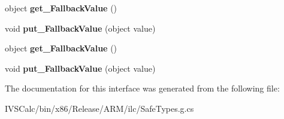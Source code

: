 \begin{DoxyCompactItemize}
\item 
\mbox{\label{interface_windows_1_1_u_i_1_1_xaml_1_1_data_1_1_i_binding2_a737ad88f941b133d93f199ad69775013}} 
object {\bfseries get\+\_\+\+Fallback\+Value} ()
\item 
\mbox{\label{interface_windows_1_1_u_i_1_1_xaml_1_1_data_1_1_i_binding2_ac552a7f9e03997146250b19bd1f8dbfc}} 
void {\bfseries put\+\_\+\+Fallback\+Value} (object value)
\item 
\mbox{\label{interface_windows_1_1_u_i_1_1_xaml_1_1_data_1_1_i_binding2_a737ad88f941b133d93f199ad69775013}} 
object {\bfseries get\+\_\+\+Fallback\+Value} ()
\item 
\mbox{\label{interface_windows_1_1_u_i_1_1_xaml_1_1_data_1_1_i_binding2_ac552a7f9e03997146250b19bd1f8dbfc}} 
void {\bfseries put\+\_\+\+Fallback\+Value} (object value)
\end{DoxyCompactItemize}


The documentation for this interface was generated from the following file\+:\begin{DoxyCompactItemize}
\item 
I\+V\+S\+Calc/bin/x86/\+Release/\+A\+R\+M/ilc/Safe\+Types.\+g.\+cs\end{DoxyCompactItemize}
